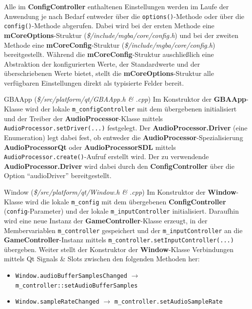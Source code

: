 \documentclass[11pt,a4paper]{scrartcl}
\begin{document}
Alle im \textbf{ConfigController} enthaltenen Einstellungen werden im Laufe der Anwendung je nach Bedarf entweder \"uber die \verb|options()|-Methode oder \"uber die \verb|config()|-Methode abgerufen. Dabei wird bei der ersten Methode eine \textbf{mCoreOptions}-Struktur (\textit{\$/include/mgba/core/config.h}) und bei der zweiten Methode eine \textbf{mCoreConfig}-Struktur (\textit{\$/include/mgba/core/config.h}) bereitgestellt. W\"ahrend die \textbf{mCoreConfig}-Struktur auschlie{\ss}lich eine Abstraktion der konfigurierten Werte, der Standardwerte und der \"uberschriebenen Werte bietet, stellt die \textbf{mCoreOptions}-Struktur alle verf\"ugbaren Einstellungen direkt als typisierte Felder bereit.

\vspace{5mm}
\large GBAApp \normalsize(\textit{\$/src/platform/qt/GBAApp.h \& .cpp})
\vspace{2mm}\newline
Im Konstruktor der \textbf{GBAApp}-Klasse wird der lokale \verb|m_configController| mit dem \"ubergebenen initialisiert und der Treiber der \textbf{AudioProcessor}-Klasse mittels \verb|AudioProcessor.setDriver(...)| festgelegt. Der \textbf{AudioProcessor.Driver} (eine Enumeration) legt dabei fest, ob entweder die \textbf{AudioProcessor}-Spezialisierung \textbf{AudioProcessorQt} oder \textbf{AudioProcessorSDL} mittels \verb|AudioProcessor.create()|-Aufruf erstellt wird. Der zu verwendende \textbf{AudioProcessor.Driver} wird dabei durch den \textbf{ConfigController} \"uber die Option \enquote{audioDriver} bereitgestellt.

\vspace{5mm}
\large Window \normalsize(\textit{\$/src/platform/qt/Window.h \& .cpp})
\vspace{2mm}\newline
Im Konstruktor der \textbf{Window}-Klasse wird die lokale \verb|m_config| mit dem \"ubergebenen \textbf{ConfigController} (\verb|config|-Parameter) und der lokale \verb|m_inputController| initialisiert. Daraufhin wird eine neue Instanz der \textbf{GameController}-Klasse erzeugt, in der Membervariablen \verb|m_controller| gespeichert und der \verb|m_inputController| an die \textbf{GameController}-Instanz mittels \verb|m_controller.setInputController(...)| \"ubergeben. Weiter stellt der Konstruktor der \textbf{Window}-Klasse Verbindungen mittels Qt Signals \& Slots zwischen den folgenden Methoden her:

\begin{itemize}
    \item \verb|Window.audioBufferSamplesChanged| $\rightarrow$ \verb|m_controller::setAudioBufferSamples|
    \item \verb|Window.sampleRateChanged| $\rightarrow$ \verb|m_controller.setAudioSampleRate|
\end{itemize}
\end{document}
